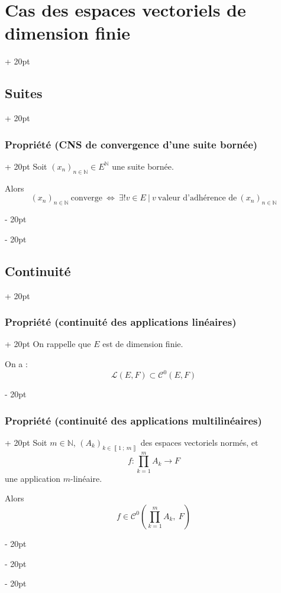 \documentclass[a4paper, 12pt, twoside]{article}
\newcommand{\N}{\mathbb{N}} %
\newcommand{\nset}[2]{\left\llbracket #1\ ;\ #2 \right\rrbracket}
\newcommand{\lr}[1]{\left( #1 \right)}
\newcommand{\ssi}{\ \Leftrightarrow \ }
\newcommand{\ind}[1][20pt]{\advance\leftskip + #1}
\newcommand{\deind}[1][20pt]{\advance\leftskip - #1}
\newenvironment{indt}[2][20pt]{#2 \par \ind[#1]}{\par \deind} %
\begin{document}
\begin{indt}{\section{Cas des espaces vectoriels de dimension finie}}
\begin{indt}{\subsection{Suites}}
            \vspace{12pt}
            
            \begin{indt}{\subsubsection{Propriété (CNS de convergence d'une suite bornée)}}
                Soit $\lr{x_n}_{n \in \N} \in E^\N$ une suite bornée.

                Alors
                \[
                    \lr{x_n}_{n \in \N}\ \text{converge}
                    \ssi
                    \exists! v \in E\ |\ v\ \text{valeur d'adhérence de}\
                    \lr{x_n}_{n \in \N}
                \]
            \end{indt}
        \end{indt}

        \vspace{12pt}
        
        \begin{indt}{\subsection{Continuité}}
            \begin{indt}{\subsubsection{Propriété (continuité des applications linéaires)}}
                On rappelle que $E$ est de dimension finie.

                On a :
                \[
                    \mathcal L(E, F) \subset \mathcal C^0(E, F)
                \]
            \end{indt}

            \vspace{12pt}
            
            \begin{indt}{\subsubsection{Propriété (continuité des applications multilinéaires)}}
                Soit $m \in \N$, $\lr{A_k}_{k \in \nset 1 m}$ des espaces vectoriels normés, et
                \[
                    f : \prod_{k = 1}^m A_k \longrightarrow F
                \]
                une application $m$-linéaire.

                \vspace{6pt}
                
                Alors
                \[
                    \displaystyle f \in \mathcal C^0\!\lr{\prod_{k = 1}^m A_k,\ F}
                \]
            \end{indt}
        \end{indt}
    \end{indt}
    
\end{document}
